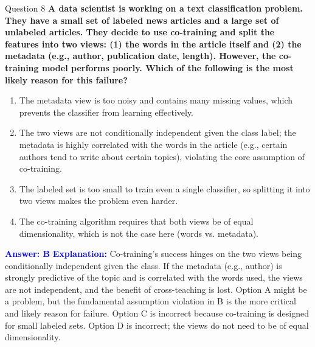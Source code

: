 \documentclass{beamer}
\begin{document}
	\begin{frame}{Question 8}
		\textbf{A data scientist is working on a text classification problem. They have a small set of labeled news articles and a large set of unlabeled articles. They decide to use co-training and split the features into two views: (1) the words in the article itself and (2) the metadata (e.g., author, publication date, length). However, the co-training model performs poorly. Which of the following is the most likely reason for this failure?}
		\begin{enumerate}
			\item The metadata view is too noisy and contains many missing values, which prevents the classifier from learning effectively.
			\item The two views are not conditionally independent given the class label; the metadata is highly correlated with the words in the article (e.g., certain authors tend to write about certain topics), violating the core assumption of co-training.
			\item The labeled set is too small to train even a single classifier, so splitting it into two views makes the problem even harder.
			\item The co-training algorithm requires that both views be of equal dimensionality, which is not the case here (words vs. metadata).
		\end{enumerate}
		\vspace{0.2cm}
		\textcolor{blue}{\textbf{Answer: B}}
		\vspace{0.2cm}
		\textcolor{blue}{\textbf{Explanation:}} Co-training's success hinges on the two views being conditionally independent given the class. If the metadata (e.g., author) is strongly predictive of the topic and is correlated with the words used, the views are not independent, and the benefit of cross-teaching is lost. Option A might be a problem, but the fundamental assumption violation in B is the more critical and likely reason for failure. Option C is incorrect because co-training is designed for small labeled sets. Option D is incorrect; the views do not need to be of equal dimensionality.
	\end{frame}
	
\end{document}
